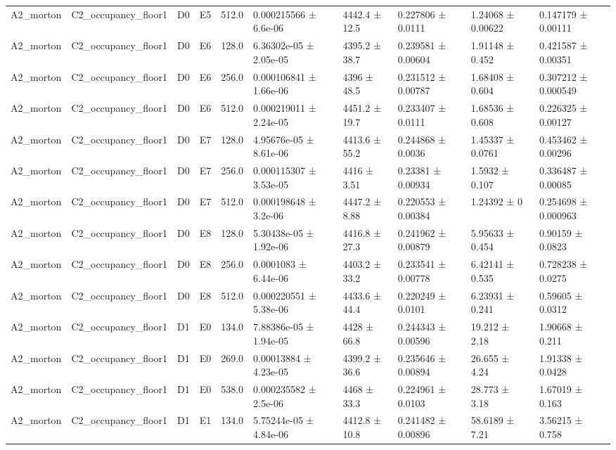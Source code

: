 \begin{table}
\begin{tabular}{llllllllll}
A2\_morton & C2\_occupancy\_floor1 & D0 & E5 & 512.0 & 0.000215566 ± 6.6e-06 & 4442.4 ± 12.5 & 0.227806 ± 0.0111 & 1.24068 ± 0.00622 & 0.147179 ± 0.00111 \\
A2\_morton & C2\_occupancy\_floor1 & D0 & E6 & 128.0 & 6.36302e-05 ± 2.05e-05 & 4395.2 ± 38.7 & 0.239581 ± 0.00604 & 1.91148 ± 0.452 & 0.421587 ± 0.00351 \\
A2\_morton & C2\_occupancy\_floor1 & D0 & E6 & 256.0 & 0.000106841 ± 1.66e-06 & 4396 ± 48.5 & 0.231512 ± 0.00787 & 1.68408 ± 0.604 & 0.307212 ± 0.000549 \\
A2\_morton & C2\_occupancy\_floor1 & D0 & E6 & 512.0 & 0.000219011 ± 2.24e-05 & 4451.2 ± 19.7 & 0.233407 ± 0.0111 & 1.68536 ± 0.608 & 0.226325 ± 0.00127 \\
A2\_morton & C2\_occupancy\_floor1 & D0 & E7 & 128.0 & 4.95676e-05 ± 8.61e-06 & 4413.6 ± 55.2 & 0.244868 ± 0.0036 & 1.45337 ± 0.0761 & 0.453462 ± 0.00296 \\
A2\_morton & C2\_occupancy\_floor1 & D0 & E7 & 256.0 & 0.000115307 ± 3.53e-05 & 4416 ± 3.51 & 0.23381 ± 0.00934 & 1.5932 ± 0.107 & 0.336487 ± 0.00085 \\
A2\_morton & C2\_occupancy\_floor1 & D0 & E7 & 512.0 & 0.000198648 ± 3.2e-06 & 4447.2 ± 8.88 & 0.220553 ± 0.00384 & 1.24392 ± 0 & 0.254698 ± 0.000963 \\
A2\_morton & C2\_occupancy\_floor1 & D0 & E8 & 128.0 & 5.30438e-05 ± 1.92e-06 & 4416.8 ± 27.3 & 0.241962 ± 0.00879 & 5.95633 ± 0.454 & 0.90159 ± 0.0823 \\
A2\_morton & C2\_occupancy\_floor1 & D0 & E8 & 256.0 & 0.0001083 ± 6.44e-06 & 4403.2 ± 33.2 & 0.233541 ± 0.00778 & 6.42141 ± 0.535 & 0.728238 ± 0.0275 \\
A2\_morton & C2\_occupancy\_floor1 & D0 & E8 & 512.0 & 0.000220551 ± 5.38e-06 & 4433.6 ± 44.4 & 0.220249 ± 0.0101 & 6.23931 ± 0.241 & 0.59605 ± 0.0312 \\
A2\_morton & C2\_occupancy\_floor1 & D1 & E0 & 134.0 & 7.88386e-05 ± 1.94e-05 & 4428 ± 66.8 & 0.244343 ± 0.00596 & 19.212 ± 2.18 & 1.90668 ± 0.211 \\
A2\_morton & C2\_occupancy\_floor1 & D1 & E0 & 269.0 & 0.00013884 ± 4.23e-05 & 4399.2 ± 36.6 & 0.235646 ± 0.00894 & 26.655 ± 4.24 & 1.91338 ± 0.0428 \\
A2\_morton & C2\_occupancy\_floor1 & D1 & E0 & 538.0 & 0.000235582 ± 2.5e-06 & 4468 ± 33.3 & 0.224961 ± 0.0103 & 28.773 ± 3.18 & 1.67019 ± 0.163 \\
A2\_morton & C2\_occupancy\_floor1 & D1 & E1 & 134.0 & 5.75244e-05 ± 4.84e-06 & 4412.8 ± 10.8 & 0.241482 ± 0.00896 & 58.6189 ± 7.21 & 3.56215 ± 0.758 \\

\end{tabular}
\end{table}
